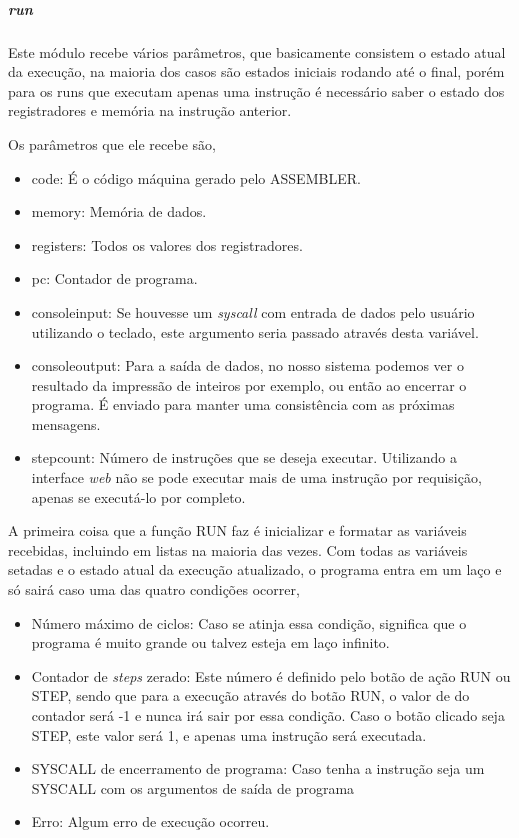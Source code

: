 				\subparagraph{run}

					Este módulo recebe vários parâmetros, que basicamente consistem o estado atual da execução, na maioria dos casos são estados iniciais rodando até o final, porém para os runs que executam apenas uma instrução é necessário saber o estado dos registradores e memória na instrução anterior.

					Os parâmetros que ele recebe são, 
					\begin{itemize} 
						\item code: É o código máquina gerado pelo ASSEMBLER.
						\item memory: Memória de dados.
						\item registers: Todos os valores dos registradores.
						\item pc: Contador de programa.
						\item console\textunderscore input: Se houvesse um \textit{syscall} com entrada de dados pelo usuário utilizando o teclado, este argumento seria passado através desta variável. 
						\item console\textunderscore  output: Para a saída de dados, no nosso sistema podemos ver o resultado da impressão de inteiros por exemplo, ou então ao encerrar o programa. É enviado para manter uma consistência com as próximas mensagens.
						\item step\textunderscore count: Número de instruções que se deseja executar. Utilizando a interface \textit{web} não se pode executar mais de uma instrução por requisição, apenas se executá-lo por completo.
					\end{itemize}

					A primeira coisa que a função RUN faz é inicializar e formatar as variáveis recebidas, incluindo em listas na maioria das vezes. Com todas as variáveis setadas e o estado atual da execução atualizado, o programa entra em um laço e só sairá caso uma das quatro condições ocorrer,

					\begin{itemize} 
						\item Número máximo de ciclos: Caso se atinja essa condição, significa que o programa é muito grande ou talvez esteja em laço infinito.
						\item Contador de \textit{steps} zerado: Este número é definido pelo botão de ação RUN ou STEP, sendo que para a execução através do botão RUN, o valor de do contador será -1 e nunca irá sair por essa condição. Caso o botão clicado seja STEP, este valor será 1, e apenas uma instrução será executada.
						\item SYSCALL de encerramento de programa: Caso tenha a instrução seja um SYSCALL com os argumentos de saída de programa
						\item Erro: Algum erro de execução ocorreu.
						
					\end{itemize}

